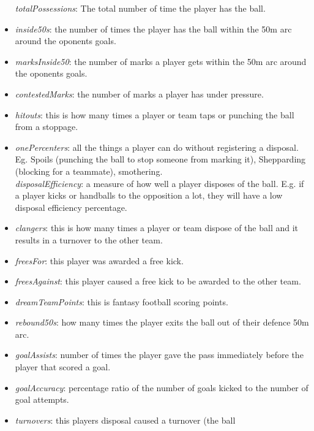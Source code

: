\begin{itemize}
  \emph{totalPossessions}: The total number of time the player has the
  ball.
\item
  \emph{inside50s}: the number of times the player has the ball within
  the 50m arc around the oponents goals.\\
\item
  \emph{marksInside50}: the number of marks a player gets within the 50m
  arc around the oponents goals.\\
\item
  \emph{contestedMarks}: the number of marks a player has under
  pressure.
\item
  \emph{hitouts}: this is how many times a player or team taps or
  punching the ball from a stoppage.
\item
  \emph{onePercenters}: all the things a player can do without
  registering a disposal. Eg. Spoils (punching the ball to stop someone
  from marking it), Shepparding (blocking for a teammate), smothering.\\
  \emph{disposalEfficiency}: a measure of how well a player disposes of
  the ball. E.g. if a player kicks or handballs to the opposition a lot,
  they will have a low disposal efficiency percentage.\\
\item
  \emph{clangers}: this is how many times a player or team dispose of
  the ball and it results in a turnover to the other team.\\
\item
  \emph{freesFor}: this player was awarded a free kick.\\
\item
  \emph{freesAgainst}: this player caused a free kick to be awarded to
  the other team.\\
\item
  \emph{dreamTeamPoints}: this is fantasy football scoring points.\\
\item
  \emph{rebound50s}: how many times the player exits the ball out of
  their defence 50m arc.\\
\item
  \emph{goalAssists}: number of times the player gave the pass
  immediately before the player that scored a goal.
\item
  \emph{goalAccuracy}: percentage ratio of the number of goals kicked to
  the number of goal attempts.\\
\item
  \emph{turnovers}: this players disposal caused a turnover (the ball

\end{itemize}
